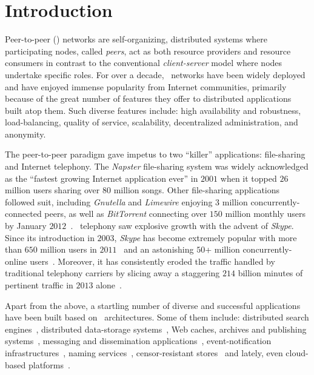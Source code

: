 \section{Introduction}
\label{section:intro}

Peer-to-peer (\p) networks are self-organizing, distributed systems where
participating nodes, called \emph{peers}, act as both resource providers and
resource consumers in contrast to the conventional \emph{client-server} model
where nodes undertake specific roles.
For over a decade, \p\ networks have been widely deployed and have
enjoyed immense popularity from Internet communities, primarily because
of the great number of features they offer to distributed applications 
built atop them. 
Such diverse features include:  high availability and robustness,
load-balancing, quality of service, scalability, decentralized administration,
and anonymity. 

The peer-to-peer paradigm gave impetus to two ``killer'' applications:
file-sharing and Internet telephony.
The \emph{Napster} file-sharing system was widely acknowledged as the 
``fastest growing Internet application ever'' in $2001$ when it topped
$26$ million users sharing over $80$ million songs.
Other file-sharing applications followed suit, 
including \emph{Gnutella} and \emph{Limewire} enjoying $3$ 
million concurrently-connected peers, as well as 
\emph{BitTorrent} connecting over $150$ million monthly users by January $2012$~\cite{bittorrentusers}.
\p\ telephony saw explosive growth with the advent of \emph{Skype}.
Since its introduction in $2003$,
\emph{Skype} has become extremely popular with more than $650$ million users 
in $2011$~\cite{skypetotalusers} and an astonishing 
$50$+ million concurrently-online users~\cite{skypesymusers}.
Moreover, it has consistently eroded  the traffic handled by 
traditional telephony carriers by slicing away a staggering 
$214$ billion minutes of pertinent traffic in $2013$ alone~\cite{skypetraffic}.

Apart from the above, a startling number of diverse and successful
applications have been built based on \p\ architectures. Some of them include:
distributed search engines~\cite{yaci}, 
distributed data-storage systems~\cite{kbc_oceanstore_2000,bdet_fsdfs_2000,dkkms_cfs_2001,dr_pastutility_2001,abc_farsite_2002,mmfc_ivy_2002,arla,agebh_dks_2003},
Web caches, archives and publishing systems~\cite{ird_squirrel_2002,bags_youserv_2002,wrc_publius_2000,wm_tangler_2001},
messaging and dissemination applications~\cite{threedegrees,icpp08-pd}, 
event-notification infrastructures~\cite{rkcd_scribe_2001,cdkr_scribe_2002,agebh_dks_2003}, 
naming services~\cite{cmm_chorddns_2002}, 
censor-resistant stores~\cite{cswh_freenet_2001} and
lately, even cloud-based platforms~\cite{mgpj_cloudsnap_2011}.


